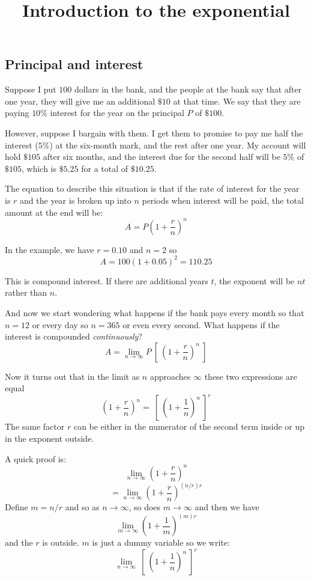 \documentclass[11pt, oneside]{article}
\title{Introduction to the exponential}
\date{}
\begin{document}
\maketitle
\Large


\subsection*{Principal and interest}
Suppose I put $100$ dollars in the bank, and the people at the bank say that after one year, they will give me an additional $\$10$ at that time.  We say that they are paying $10\%$ interest for the year on the principal $P$ of $\$100$.

However, suppose I bargain with them.  I get them to promise to pay me half the interest ($5\%$) at the six-month mark, and the rest after one year.  My account will hold $\$105$ after six months, and the interest due for the second half will be $5\%$ of $\$105$, which is $\$5.25$ for a total of $\$10.25$.

The equation to describe this situation is that if the rate of interest for the year is $r$ and the year is broken up into $n$ periods when interest will be paid, the total amount at the end will be:
\[ A = P(1 + \frac{r}{n})^n \]

In the example, we have $r = 0.10$ and $n = 2$ so
\[ A = 100 (1 + 0.05)^{2} = 110.25 \]

This is compound interest.  If there are additional years $t$, the exponent will be $nt$ rather than $n$.

And now we start wondering what happens if the bank pays every month so that $n=12$ or every day so $n=365$ or even every second.  What happens if the interest is compounded \emph{continuously}?
\[ A = \lim_{n \rightarrow \infty} P \ [ \ (1 + \frac{r}{n})^{n} \ ] \]

Now it turns out that in the limit as $n$ approaches $\infty$ these two expressions are equal
\[ (1 + \frac{r}{n})^n = \ [ \ (1 + \frac{1}{n})^n \ ]^r \]
The same factor $r$ can be either in the numerator of the second term inside or up in the exponent outside.  

A quick proof is:
\[ \lim_{n \rightarrow \infty} (1 + \frac{r}{n})^{n}  \]
\[ = \lim_{n \rightarrow \infty} (1 + \frac{r}{n})^{(n/r)r} \]
Define $m = n/r$ and so as $n \rightarrow \infty$, so does $m \rightarrow \infty$ and then we have
\[ \lim_{m \rightarrow \infty} (1 + \frac{1}{m})^{(m)r} \]
and the $r$ is outside.  $m$ is just a dummy variable so we write:
\[ \lim_{n \rightarrow \infty} \ [ \  (1 + \frac{1}{n})^{n} \ ]^r \]
\end{document}
